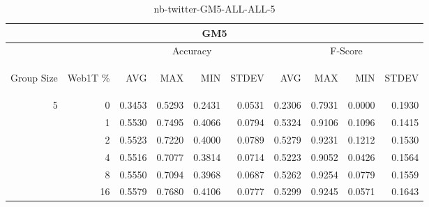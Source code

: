 \begin{center}
\begin{table}[htbp]
\begin{tabular}{ | r | r | r | r | r | r | r | r | r | r |}
\hline
\multicolumn{10}{|c|}{GM5}\\
\hline
 & & \multicolumn{4}{|c|}{Accuracy} & \multicolumn{4}{|c|}{F-Score}\\ \cline{3-10}
\begin{sideways}Group Size\end{sideways} & \begin{sideways}Web1T \%\end{sideways} & \begin{sideways}AVG\end{sideways} & \begin{sideways}MAX\end{sideways} & \begin{sideways}MIN\end{sideways} & \begin{sideways}STDEV\end{sideways} & \begin{sideways}AVG\end{sideways} & \begin{sideways}MAX\end{sideways} & \begin{sideways}MIN\end{sideways} & \begin{sideways}STDEV\end{sideways}\\
\hline
\multirow{5}{*}{5}
 & 0 & 0.3453 & 0.5293 & 0.2431 & 0.0531 & 0.2306 & 0.7931 & 0.0000 & 0.1930\\ \cline{2-10}
 & 1 & 0.5530 & 0.7495 & 0.4066 & 0.0794 & 0.5324 & 0.9106 & 0.1096 & 0.1415\\ \cline{2-10}
 & 2 & 0.5523 & 0.7220 & 0.4000 & 0.0789 & 0.5279 & 0.9231 & 0.1212 & 0.1530\\ \cline{2-10}
 & 4 & 0.5516 & 0.7077 & 0.3814 & 0.0714 & 0.5223 & 0.9052 & 0.0426 & 0.1564\\ \cline{2-10}
 & 8 & 0.5550 & 0.7094 & 0.3968 & 0.0687 & 0.5262 & 0.9254 & 0.0779 & 0.1559\\ \cline{2-10}
 & 16 & 0.5579 & 0.7680 & 0.4106 & 0.0777 & 0.5299 & 0.9245 & 0.0571 & 0.1643\\ \cline{2-10}
\hline
\end{tabular}
\caption{nb-twitter-GM5-ALL-ALL-5}
\label{table:nb-twitter-GM5-ALL-ALL-5}
\end{table}
\end{center}

